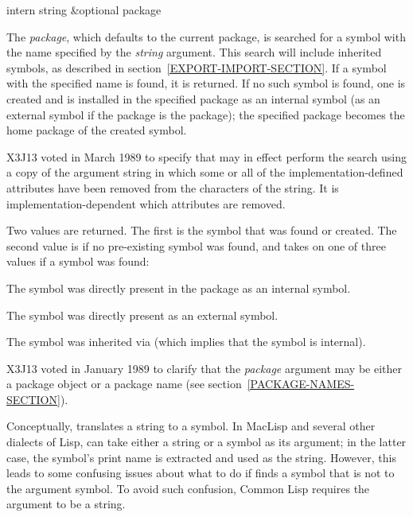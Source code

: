 \begin{defun}[Function]
intern string &optional package

The {\it package}, which defaults to the current package, is
searched for a symbol with the name specified by the {\it string}
argument.  This search will include inherited symbols, as described
in section~\ref{EXPORT-IMPORT-SECTION}.
If a symbol with the specified name is found, it is returned.
If no such symbol is found, one is created and is installed in the
specified package as an internal symbol (as an external symbol
if the package is the  package); the specified package becomes the
home package of the created symbol.


\begin{newer}
X3J13 voted in March 1989 
to specify that  may in effect perform the
search using a copy of the argument string in which
some or all of the implementation-defined
attributes have been removed from the characters of the string.
It is implementation-dependent which attributes are removed.
\end{newer}

Two values are returned.  The first is the symbol that was found or
created.  The second value is {\false} if no pre-existing symbol was found,
and takes on one of three values if a symbol was found:
\begin{indentdesc}{6pc}
\item[\cd{:internal}]
The symbol was directly present in the package as an internal symbol.

\item[\cd{:external}]
The symbol was directly present as an external symbol.

\item[\cd{:inherited}]
The symbol was inherited via  (which
implies that the symbol is internal).
\end{indentdesc}

\begin{new}
X3J13 voted in January 1989
to clarify that the {\it package} argument may be either a package object
or a package name (see section~\ref{PACKAGE-NAMES-SECTION}).
\end{new}

\beforenoterule
\begin{incompatibility}
Conceptually,  translates a
string to a symbol.  In MacLisp and several other dialects of Lisp,
 can take either a string or a symbol as its argument; in the 
latter case, the symbol's print name is extracted and used as the string.  
However, this leads to some confusing issues about what to do if
 finds a symbol that is not  to the argument symbol.  To
avoid such confusion, Common Lisp requires the argument to be a string.
\end{incompatibility}
\afternoterule
\end{defun}

